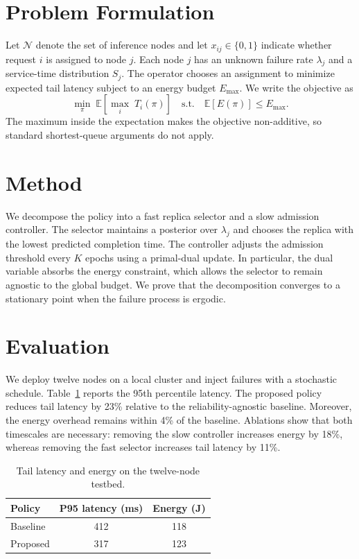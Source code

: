 \documentclass[conference]{IEEEtran}
\begin{document}
\section{Problem Formulation}
\label{sec:problem}
Let $\mathcal{N}$ denote the set of inference nodes and let $x_{ij} \in \{0,1\}$ indicate whether request $i$ is assigned to node $j$.
Each node $j$ has an unknown failure rate $\lambda_j$ and a service-time distribution $S_j$.
The operator chooses an assignment to minimize expected tail latency subject to an energy budget $E_{\max}$.
We write the objective as
\begin{equation}
\label{eq:objective}
\min_{\pi} \; \mathbb{E}\left[ \max_{i} \; T_i(\pi) \right]
\quad \text{s.t.} \quad \mathbb{E}[E(\pi)] \le E_{\max}.
\end{equation}
The maximum inside the expectation makes the objective non-additive, so standard shortest-queue arguments do not apply.

\section{Method}
\label{sec:method}
We decompose the policy into a fast replica selector and a slow admission controller.
The selector maintains a posterior over $\lambda_j$ and chooses the replica with the lowest predicted completion time.
The controller adjusts the admission threshold every $K$ epochs using a primal-dual update.
In particular, the dual variable absorbs the energy constraint, which allows the selector to remain agnostic to the global budget.
We prove that the decomposition converges to a stationary point when the failure process is ergodic.

\section{Evaluation}
\label{sec:eval}
We deploy twelve nodes on a local cluster and inject failures with a stochastic schedule.
Table~\ref{tab:results} reports the 95th percentile latency.
The proposed policy reduces tail latency by 23\% relative to the reliability-agnostic baseline.
Moreover, the energy overhead remains within 4\% of the baseline.
Ablations show that both timescales are necessary: removing the slow controller increases energy by 18\%, whereas removing the fast selector increases tail latency by 11\%.

\begin{table}[t]
\centering
\caption{Tail latency and energy on the twelve-node testbed.}
\label{tab:results}
\begin{tabular}{lcc}
\toprule
Policy & P95 latency (ms) & Energy (J) \\
\midrule
Baseline & 412 & 118 \\
Proposed & 317 & 123 \\
\bottomrule
\end{tabular}
\end{table}
\end{document}
